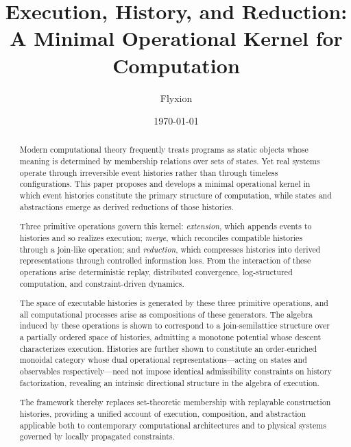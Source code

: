\documentclass[12pt]{article}
\title{Execution, History, and Reduction:\\
A Minimal Operational Kernel for Computation}
\author{Flyxion}
\date{\today}
\begin{document}

\maketitle

\begin{abstract}
Modern computational theory frequently treats programs as static objects whose meaning is
determined by membership relations over sets of states. Yet real systems operate through
irreversible event histories rather than through timeless configurations. This paper proposes
and develops a minimal operational kernel in which event histories constitute the primary
structure of computation, while states and abstractions emerge as derived reductions of those
histories.

Three primitive operations govern this kernel: \emph{extension}, which appends events to
histories and so realizes execution; \emph{merge}, which reconciles compatible histories through
a join-like operation; and \emph{reduction}, which compresses histories into derived
representations through controlled information loss. From the interaction of these operations
arise deterministic replay, distributed convergence, log-structured computation, and
constraint-driven dynamics.

The space of executable histories is generated by these three primitive operations, and all
computational processes arise as compositions of these generators. The algebra induced by these
operations is shown to correspond to a join-semilattice structure over a partially ordered space
of histories, admitting a monotone potential whose descent characterizes execution. Histories
are further shown to constitute an order-enriched monoidal category whose dual operational
representations---acting on states and observables respectively---need not impose identical
admissibility constraints on history factorization, revealing an intrinsic directional structure
in the algebra of execution.

The framework thereby replaces set-theoretic membership with replayable construction histories,
providing a unified account of execution, composition, and abstraction applicable both to
contemporary computational architectures and to physical systems governed by locally propagated
constraints.
\end{abstract}

\tableofcontents

\newpage
\end{document}
